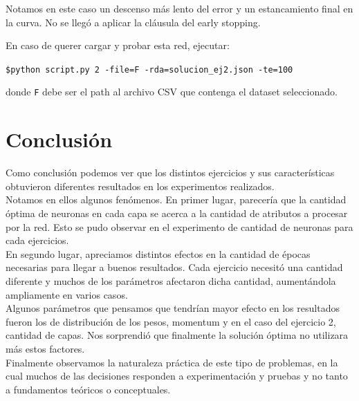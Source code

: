 \newpage

Notamos en este caso un descenso más lento del error y un estancamiento final en la curva. No se llegó a aplicar la cláusula del early stopping.


En caso de querer cargar y probar esta red, ejecutar:

\texttt{\$python script.py 2 -file=F -rda=solucion\_ej2.json -te=100 }

donde \texttt{F} debe ser el path al archivo CSV que contenga el dataset seleccionado.

\section{Conclusión}

Como conclusión podemos ver que los distintos ejercicios y sus características obtuvieron diferentes resultados en los experimentos realizados.\\

Notamos en ellos algunos fenómenos. En primer lugar, parecería que la cantidad óptima de neuronas en cada capa se acerca a la cantidad de atributos a procesar por la red. Esto se pudo observar en el experimento de cantidad de neuronas para cada ejercicios.\\
En segundo lugar, apreciamos distintos efectos en la cantidad de épocas necesarias para llegar a buenos resultados. Cada ejercicio necesitó una cantidad diferente y muchos de los parámetros afectaron dicha cantidad, aumentándola ampliamente en varios casos.\\

Algunos parámetros que pensamos que tendrían mayor efecto en los resultados fueron los de distribución de los pesos, momentum y en el caso del ejercicio 2, cantidad de capas. Nos sorprendió que finalmente la solución óptima no utilizara más estos factores.\\

Finalmente observamos la naturaleza práctica de este tipo de problemas, en la cual muchos de las decisiones responden a experimentación y pruebas y no tanto a fundamentos teóricos o conceptuales.
